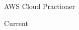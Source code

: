 

\begin{cventries}
    \cventry
    {AWS Cloud Practioner} %
    
    {Current} %
   
\end{cventries}